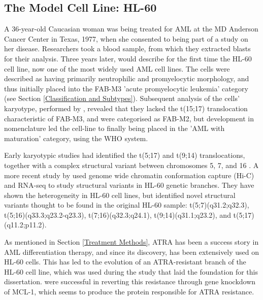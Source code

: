 \subsection{The Model Cell Line: HL-60 }
A 36-year-old Caucasian woman was being treated for \ac{AML} at the MD Anderson Cancer Center in Texas, 1977, when she consented to being part of a study on her disease. Researchers took a blood sample, from which they extracted blasts for their analysis. Three years later, \cite{gallagher1979characterization} would describe for the first time the HL-60 cell line, now one of the most widely used \ac{AML} cell lines. The cells were described as having primarily neutrophilic and promyelocytic morphology, and thus initially placed into the \ac{FAB}-M3 'acute promyelocytic leukemia' category (see Section \ref{Classification and Subtypes}). Subsequent analysis of the cells' karyotype, performed by \cite{dalton1988hl}, revealed that they lacked the t(15;17) translocation characteristic of \ac{FAB}-M3, and were categorised as \ac{FAB}-M2, but development in nomenclature led the cell-line to finally being placed in the 'AML with maturation' category, using the \ac{WHO} system.

Early karyotypic studies had identified the t(5;17) \citep{von1990double} and t(9;14) translocations, together with a complex structural variant between chromosomes 5, 7, and 16 \citep{liang1999spectral}. A more recent study by \cite{jacob} used genome wide chromatin conformation capture (Hi-C) and RNA-seq to study structural variants in HL-60 genetic branches. They have shown the heterogeneity in HL-60 cell lines, but identified novel structural variants thought to be found in the original HL-60 sample: t(5;7)(q31.2;q32.3), t(5;16)(q33.3;q23.2-q23.3), t(7;16)(q32.3;q24.1), t(9;14)(q31.1;q23.2), and t(5;17)(q11.2;p11.2).

As mentioned in Section \ref{Treatment Methods}, \ac{ATRA} has been a success story in \ac{AML} differentiation therapy, and since its discovery, has been extensively used on HL-60 cells. This has led to the evolution of an ATRA-resistant branch of the HL-60 cell line, which was used during the study \citep{Gatt2016} that laid the foundation for this dissertation. \cite{fu2005effects} were successful in reverting this resistance through gene knockdown of MCL-1, which seems to produce the protein responsible for \ac{ATRA} resistance.




